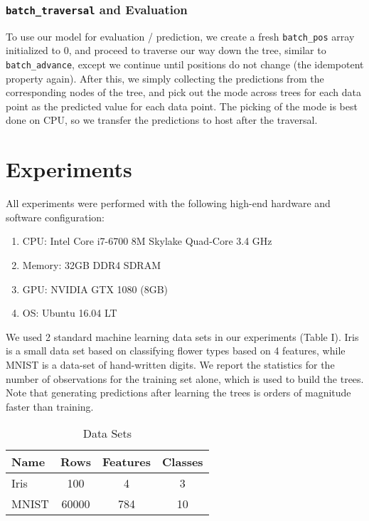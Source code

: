 \documentclass[10pt,conference]{IEEEtran}
\begin{document}
  \subsubsection{\texttt{batch\_traversal} and Evaluation}
    To use our model for evaluation / prediction, we create a fresh \texttt{batch\_pos} array initialized to 0, and proceed to traverse our way down the tree, similar to \texttt{batch\_advance}, except we continue until positions do not change (the idempotent property again). After this, we simply collecting the predictions from the corresponding nodes of the tree, and pick out the mode across trees for each data point as the predicted value for each data point. The picking of the mode is best done on CPU, so we transfer the predictions to host after the traversal.
    
\section{Experiments}


All experiments were performed with the following high-end hardware and software configuration:

\begin{enumerate}
  \item CPU: Intel Core i7-6700 8M Skylake Quad-Core 3.4 GHz
  \item Memory: 32GB DDR4 SDRAM
  \item GPU: NVIDIA GTX 1080 (8GB)
  \item OS: Ubuntu 16.04 LT
\end{enumerate}

We used 2 standard machine learning data sets in our experiments (Table I). Iris is a small data set based on classifying flower types based on 4 features, while MNIST is a data-set of hand-written digits. We report the statistics for the number of observations for the training set alone, which is used to build the trees. Note that generating predictions after learning the trees is orders of magnitude faster than training.

\begin{table}[H]
\centering
\begin{tabular}{lccc}
\toprule
	\centering
    \textbf{Name} & \textbf{Rows} & \textbf{Features} & \textbf{Classes}\\
    \midrule
    Iris & 100 & 4 & 3 \\ 
    MNIST & 60000 & 784 & 10 \\
    \bottomrule
\end{tabular}
\caption{\label{tab:MAE} Data Sets}
\end{table}
\end{document}

